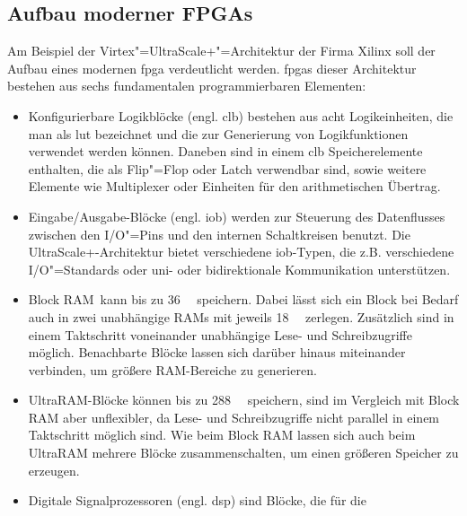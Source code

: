\subsection{Aufbau moderner FPGAs}\label{fpga:ueberblick:aufbau}

Am Beispiel der Virtex"=UltraScale+"=Architektur der Firma Xilinx soll der
Aufbau eines modernen \gls{fpga} verdeutlicht werden. \gls{fpga}s dieser
Architektur bestehen aus sechs fundamentalen programmierbaren Elementen:
\begin{itemize}
    \item Konfigurierbare Logikblöcke (engl. \gls{clb}) bestehen aus acht
          Logikeinheiten, die man als \gls{lut} bezeichnet und die zur
          Generierung von Logikfunktionen verwendet werden können. Daneben sind
          in einem \gls{clb} Speicherelemente enthalten, die als Flip"=Flop oder
          Latch verwendbar sind, sowie weitere Elemente wie Multiplexer
          oder Einheiten für den arithmetischen Übertrag.
          \cite[vgl.][6]{ultrascaleclb2017}
    \item Eingabe/Ausgabe-Blöcke (engl. \gls{iob}) werden zur Steuerung des
          Datenflusses zwischen den I/O"=Pins und den internen Schaltkreisen
          benutzt. Die UltraScale+-Architektur bietet verschiedene
          \gls{iob}-Typen, die z.B. verschiedene I/O"=Standards oder uni- oder
          bidirektionale Kommunikation unterstützen. \cite[vgl. die
          ausführliche I/O"=Beschreibung in][Kapitel 1 und 2]{ultrascaleio2019}
    \item \glqq Block RAM\grqq\ kann bis zu \SI{36}{\kilo\bit} speichern. Dabei
          lässt sich ein Block bei Bedarf auch in zwei unabhängige RAMs mit
          jeweils \SI{18}{\kilo\bit} zerlegen. Zusätzlich sind in einem
          Taktschritt voneinander unabhängige Lese- und Schreibzugriffe möglich.
          Benachbarte Blöcke lassen sich darüber hinaus miteinander verbinden,
          um größere RAM-Bereiche zu generieren.
          \cite[vgl.][6]{ultrascalemem2019}
    \item UltraRAM-Blöcke können bis zu \SI{288}{\kilo\bit} speichern, sind im
          Vergleich mit Block RAM aber unflexibler, da Lese- und Schreibzugriffe
          nicht parallel in einem Taktschritt möglich sind. Wie beim Block RAM
          lassen sich auch beim UltraRAM mehrere Blöcke zusammenschalten, um
          einen größeren Speicher zu erzeugen.
          \cite[vgl.][92--94]{ultrascalemem2019}
    \item Digitale Signalprozessoren (engl. \gls{dsp}) sind Blöcke, die für die

\end{itemize}
